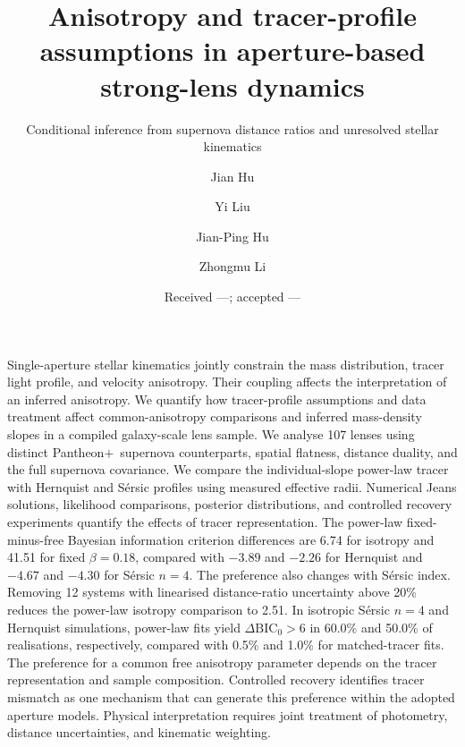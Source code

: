 \documentclass{aa}
\newcommand{\pantheon}{Pantheon$+$}
\begin{document}
\title{Anisotropy and tracer-profile assumptions in aperture-based strong-lens dynamics}
\subtitle{Conditional inference from supernova distance ratios and unresolved stellar kinematics}
\author{Jian Hu\and Yi Liu\and Jian-Ping Hu\and Zhongmu Li}
\date{Received ---; accepted ---}


\abstract
{Single-aperture stellar kinematics jointly constrain the mass distribution, tracer light profile, and velocity anisotropy. Their coupling affects the interpretation of an inferred anisotropy.}
{We quantify how tracer-profile assumptions and data treatment affect common-anisotropy comparisons and inferred mass-density slopes in a compiled galaxy-scale lens sample.}
{We analyse 107 lenses using distinct \pantheon\ supernova counterparts, spatial flatness, distance duality, and the full supernova covariance. We compare the individual-slope power-law tracer with Hernquist and S\'ersic profiles using measured effective radii. Numerical Jeans solutions, likelihood comparisons, posterior distributions, and controlled recovery experiments quantify the effects of tracer representation.}
{The power-law fixed-minus-free Bayesian information criterion differences are 6.74 for isotropy and 41.51 for fixed $\beta=0.18$, compared with $-3.89$ and $-2.26$ for Hernquist and $-4.67$ and $-4.30$ for S\'ersic $n=4$. The preference also changes with S\'ersic index. Removing 12 systems with linearised distance-ratio uncertainty above 20\% reduces the power-law isotropy comparison to 2.51. In isotropic S\'ersic $n=4$ and Hernquist simulations, power-law fits yield $\Delta\mathrm{BIC}_0>6$ in 60.0\% and 50.0\% of realisations, respectively, compared with 0.5\% and 1.0\% for matched-tracer fits.}
{The preference for a common free anisotropy parameter depends on the tracer representation and sample composition. Controlled recovery identifies tracer mismatch as one mechanism that can generate this preference within the adopted aperture models. Physical interpretation requires joint treatment of photometry, distance uncertainties, and kinematic weighting.}
\maketitle
\end{document}
